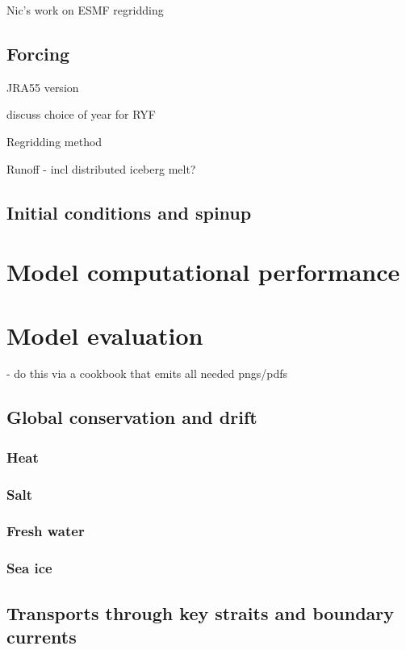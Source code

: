 \documentclass[11pt]{article}
\begin{document}
Nic's work on ESMF regridding


\subsection{Forcing}

JRA55 version

discuss choice of year for RYF

Regridding method

Runoff - incl distributed iceberg melt?

\subsection{Initial conditions and spinup}

\section{Model computational performance}

\section{Model evaluation}
 - do this via a cookbook that emits all needed pngs/pdfs 

\subsection{Global conservation and drift}

\subsubsection{Heat}

\subsubsection{Salt}

\subsubsection{Fresh water}

\subsubsection{Sea ice}


\subsection{Transports through key straits and boundary currents}
\end{document}
